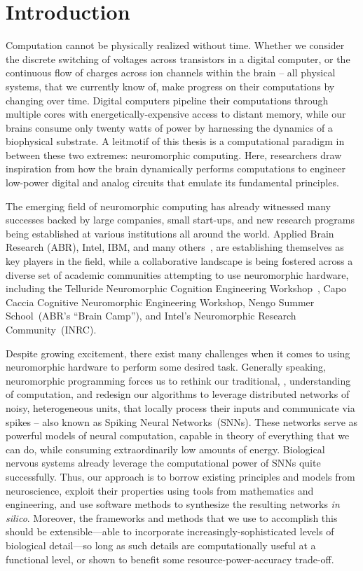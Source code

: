 
\chapter{Introduction}

Computation cannot be physically realized without time.
Whether we consider the discrete switching of voltages across transistors in a
digital computer,
or the continuous flow of charges across ion channels within the brain -- 
all physical systems, that we currently know of, make progress on their computations
by changing over time.
Digital computers pipeline their computations through multiple cores with energetically-expensive access to distant memory, while our brains consume only twenty watts of power by harnessing the dynamics of a biophysical substrate.
A leitmotif of this thesis is a computational paradigm
in between these two extremes: neuromorphic computing.
Here, researchers draw inspiration from how the
brain dynamically performs computations
to engineer low-power digital and analog circuits that emulate its fundamental principles.

The emerging field of neuromorphic computing has already
witnessed many successes backed by large companies, small start-ups, and new research
programs being established at various institutions all around the world.
Applied Brain Research (ABR), Intel, IBM, and many others~\citep{marketreport2018}, are establishing themselves as key players in the field, while a collaborative landscape is being fostered across a diverse set of academic communities attempting to use neuromorphic hardware, including the Telluride Neuromorphic Cognition Engineering Workshop~\citep{cohen2001report}, Capo Caccia Cognitive Neuromorphic Engineering Workshop, Nengo Summer School~(ABR's ``Brain Camp''), and Intel's Neuromorphic Research Community~(INRC).

Despite growing excitement, there exist many challenges when it comes to using
neuromorphic hardware to perform some desired task.
Generally speaking, neuromorphic programming forces us to rethink our traditional,
\citet{von1958}, understanding of computation, and redesign our algorithms to leverage distributed networks of noisy, heterogeneous units, that locally process their inputs and communicate via spikes -- also known as Spiking Neural Networks~(SNNs).
These networks serve as powerful models of neural computation, capable in theory of everything that we can do, while consuming extraordinarily low amounts of energy.
Biological nervous systems already leverage the computational power of SNNs quite successfully.
Thus, our approach is to borrow existing
principles and models from neuroscience, exploit their properties using tools from mathematics and engineering,
and use software methods to synthesize the resulting networks \emph{in silico}.
Moreover, the frameworks and methods that we use to accomplish this should be extensible---able to incorporate increasingly-sophisticated levels of biological detail---so long as such details are computationally useful at a functional level, or shown to benefit some resource-power-accuracy trade-off.

